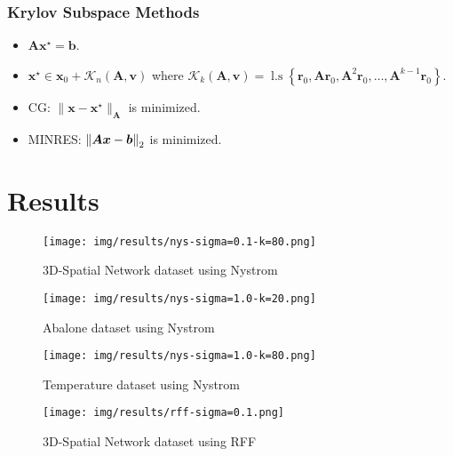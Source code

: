 \documentclass[9pt,hyperref={pdfpagelabels=false},xcolor=table]{beamer}
\begin{document}
\begin{frame}
    \frametitle{Krylov Subspace Methods}
    \begin{itemize}
        \item $\bm{A} \bm{x^{\star}} = \bm{b}$.
              \pause
        \item $\bm{x^{\star}} \in \bm{x}_0 + \mathcal{K}_{n} \left( \bm{A},\bm{v} \right)$ where  $\mathcal{K}_{k} \left( \bm{A},\bm{v} \right) = \operatorname{l.s} \left\{ \bm{r}_0, \bm{A} \bm{r}_0, \bm{A}^2 \bm{r}_0, \ldots , \bm{A}^{k-1} \bm{r}_0 \right\}$.
              \pause
        \item CG: $\| \bm{x} - \bm{x}^{\star} \|_{\bm{A}}$ is minimized.
              \pause
        \item MINRES: $\left\lVert\bm{A} \bm {x} - \bm{b}\right\rVert_2$ is minimized.
    \end{itemize}
\end{frame}

\section{Results}

\begin{frame}
    \begin{figure}
        \centering
        \texttt{[image: img/results/nys-sigma=0.1-k=80.png]}
        \caption{3D-Spatial Network dataset using Nystrom}
    \end{figure}
\end{frame}

\begin{frame}
    \begin{figure}
        \centering
        \texttt{[image: img/results/nys-sigma=1.0-k=20.png]}
        \caption{Abalone dataset using Nystrom}
    \end{figure}
\end{frame}

\begin{frame}
    \begin{figure}
        \centering
        \texttt{[image: img/results/nys-sigma=1.0-k=80.png]}
        \caption{Temperature dataset using Nystrom}
    \end{figure}
\end{frame}

\begin{frame}
    \begin{figure}
        \centering
        \texttt{[image: img/results/rff-sigma=0.1.png]}
        \caption{3D-Spatial Network dataset using RFF}
    \end{figure}
\end{frame}
\end{document}

